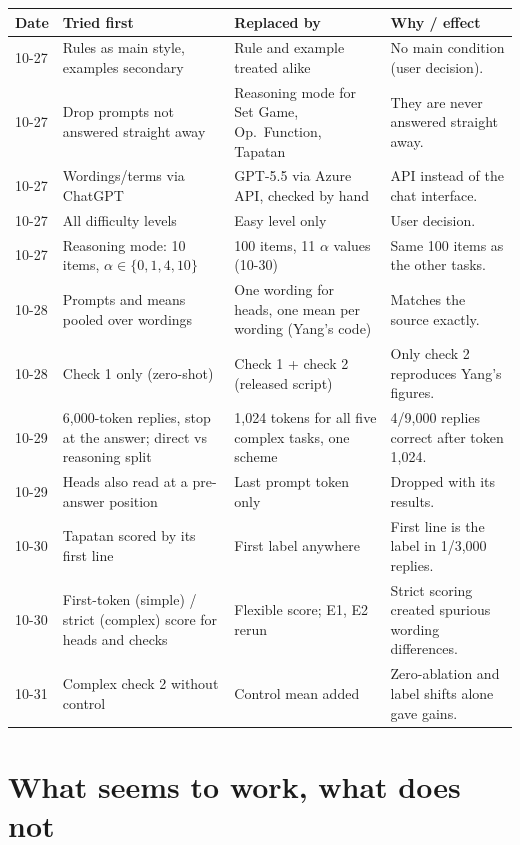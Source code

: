 \documentclass[10pt,a4paper]{article}
\begin{document}
\small
\begin{tabularx}{\textwidth}{@{}p{1.5cm}LLL@{}}
\toprule
\textbf{Date} & \textbf{Tried first} & \textbf{Replaced by} & \textbf{Why / effect} \\
-27 & Rules as main style, examples secondary & Rule and example treated alike & No main condition (user decision). \\
10-27 & Drop prompts not answered straight away & Reasoning mode for Set Game, Op.\ Function, Tapatan & They are never answered straight away. \\
10-27 & Wordings/terms via ChatGPT & GPT-5.5 via Azure API, checked by hand & API instead of the chat interface. \\
10-27 & All difficulty levels & Easy level only & User decision. \\
10-27 & Reasoning mode: 10 items, $\alpha\in\{0,1,4,10\}$ & 100 items, 11 $\alpha$ values (10-30) & Same 100 items as the other tasks. \\
10-28 & Prompts and means pooled over wordings & One wording for heads, one mean per wording (Yang's code) & Matches the source exactly. \\
10-28 & Check 1 only (zero-shot) & Check 1 + check 2 (released script) & Only check 2 reproduces Yang's figures. \\
10-29 & 6,000-token replies, stop at the answer; direct vs reasoning split & 1,024 tokens for all five complex tasks, one scheme & 4/9,000 replies correct after token 1,024. \\
10-29 & Heads also read at a pre-answer position & Last prompt token only & Dropped with its results. \\
10-30 & Tapatan scored by its first line & First label anywhere & First line is the label in 1/3,000 replies. \\
10-30 & First-token (simple) / strict (complex) score for heads and checks & Flexible score; E1, E2 rerun & Strict scoring created spurious wording differences. \\
10-31 & Complex check 2 without control & Control mean added & Zero-ablation and label shifts alone gave gains. \\
\bottomrule
\end{tabularx}
\normalsize


\section{What seems to work, what does not}
\end{document}
